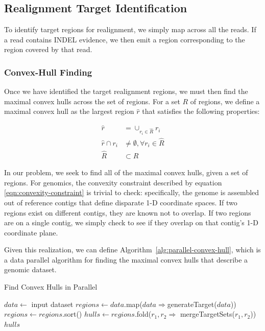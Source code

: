 \documentclass[phd]{ucbthesis}
\begin{document}
\subsection{Realignment Target Identification}
\label{sec:realignment-target-identification}

To identify target regions for realignment, we simply map across all the reads. If a read contains INDEL evidence,
we then emit a region corresponding to the region covered by that read.

\subsubsection{Convex-Hull Finding}
\label{sec:convex-hull}

Once we have identified the target realignment regions, we must then find the maximal convex hulls
across the set of regions. For a set $R$ of regions, we define a maximal convex hull as the largest
region $\hat{r}$ that satisfies the following properties:

\begin{align}
\label{eqn:convexity-constraint}
\hat{r} &= \cup_{r_i \in \hat{R}} r_i \\
\hat{r} \cap r_i &\ne \emptyset, \forall r_i \in \hat{R} \\
\hat{R} &\subset R
\end{align}

In our problem, we seek to find all of the maximal convex hulls, given a set of regions. For genomics, the
convexity constraint described by equation \eqref{eqn:convexity-constraint} is trivial to check: specifically, the
genome is assembled out of reference contigs that define disparate 1-D coordinate spaces. If two regions exist on different contigs, they
are known not to overlap. If two regions are on a single contig, we simply check to see if they overlap
on that contig's 1-D coordinate plane.

Given this realization, we can define Algorithm~\ref{alg:parallel-convex-hull}, which is a data parallel
algorithm for finding the maximal convex hulls that describe a genomic dataset.

\begin{algorithm}
\caption{Find Convex Hulls in Parallel}
\label{alg:parallel-convex-hull}
\begin{algorithmic}
\STATE $data \leftarrow$ input dataset
\STATE $regions \leftarrow data$.map($data \Rightarrow $generateTarget($data$))
\STATE $regions \leftarrow regions$.sort()
\STATE $hulls \leftarrow regions$.fold($r_1, r_2 \Rightarrow$ mergeTargetSets($r_1, r_2$))
\RETURN $hulls$
\end{algorithmic}
\end{algorithm}
\end{document}
